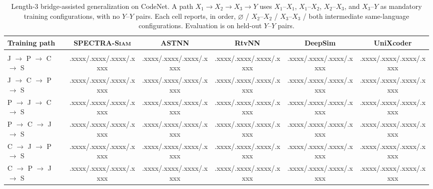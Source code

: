 \documentclass[final,5p,times,twocolumn]{elsarticle}
\newcommand{\method}{\textsc{SPECTRA-Siam}}
\theoremstyle{plain}
\begin{document}
\begin{table}[!htbp]
\centering
\caption{Length-3 bridge-assisted generalization on CodeNet. A path $X_1\!\rightarrow X_2\!\rightarrow X_3\!\rightarrow Y$ uses $X_1$--$X_1$, $X_1$--$X_2$, $X_2$--$X_3$, and $X_3$--$Y$ as mandatory training configurations, with no $Y$--$Y$ pairs. Each cell reports, in order, $\varnothing$ / $X_2$--$X_2$ / $X_3$--$X_3$ / both intermediate same-language configurations. Evaluation is on held-out $Y$--$Y$ pairs.}
\label{tab:rq3_bridge_l3}

\scriptsize
\setlength{\tabcolsep}{8.0pt}
\renewcommand{\arraystretch}{1.2}
\setlength{\aboverulesep}{0.15ex}
\setlength{\belowrulesep}{0.15ex}

\begin{adjustbox}{width=0.95\textwidth}
\begin{tabular}{@{}lccccc@{}}
\toprule
\textbf{Training path}
& \textbf{\method{}}
& \textbf{ASTNN}
& \textbf{RtvNN}
& \textbf{DeepSim}
& \textbf{UniXcoder} \\
\midrule

\rowcolor{black!7}
\multicolumn{6}{@{}l}{\textit{Target C\# (S)}} \\

J $\rightarrow$ P $\rightarrow$ C $\rightarrow$ S
& .xxxx/.xxxx/.xxxx/.xxxx
& .xxxx/.xxxx/.xxxx/.xxxx
& .xxxx/.xxxx/.xxxx/.xxxx
& .xxxx/.xxxx/.xxxx/.xxxx
& .xxxx/.xxxx/.xxxx/.xxxx \\

J $\rightarrow$ C $\rightarrow$ P $\rightarrow$ S
& .xxxx/.xxxx/.xxxx/.xxxx
& .xxxx/.xxxx/.xxxx/.xxxx
& .xxxx/.xxxx/.xxxx/.xxxx
& .xxxx/.xxxx/.xxxx/.xxxx
& .xxxx/.xxxx/.xxxx/.xxxx \\

P $\rightarrow$ J $\rightarrow$ C $\rightarrow$ S
& .xxxx/.xxxx/.xxxx/.xxxx
& .xxxx/.xxxx/.xxxx/.xxxx
& .xxxx/.xxxx/.xxxx/.xxxx
& .xxxx/.xxxx/.xxxx/.xxxx
& .xxxx/.xxxx/.xxxx/.xxxx \\

P $\rightarrow$ C $\rightarrow$ J $\rightarrow$ S
& .xxxx/.xxxx/.xxxx/.xxxx
& .xxxx/.xxxx/.xxxx/.xxxx
& .xxxx/.xxxx/.xxxx/.xxxx
& .xxxx/.xxxx/.xxxx/.xxxx
& .xxxx/.xxxx/.xxxx/.xxxx \\

C $\rightarrow$ J $\rightarrow$ P $\rightarrow$ S
& .xxxx/.xxxx/.xxxx/.xxxx
& .xxxx/.xxxx/.xxxx/.xxxx
& .xxxx/.xxxx/.xxxx/.xxxx
& .xxxx/.xxxx/.xxxx/.xxxx
& .xxxx/.xxxx/.xxxx/.xxxx \\

C $\rightarrow$ P $\rightarrow$ J $\rightarrow$ S
& .xxxx/.xxxx/.xxxx/.xxxx
& .xxxx/.xxxx/.xxxx/.xxxx
& .xxxx/.xxxx/.xxxx/.xxxx
& .xxxx/.xxxx/.xxxx/.xxxx
& .xxxx/.xxxx/.xxxx/.xxxx \\


\end{tabular}
\end{adjustbox}
\end{table}
\end{document}
